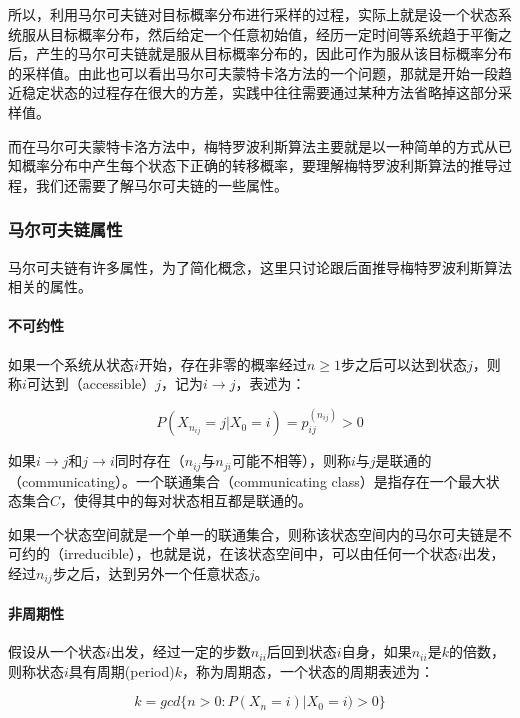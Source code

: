 所以，利用马尔可夫链对目标概率分布进行采样的过程，实际上就是设一个状态系统服从目标概率分布，然后给定一个任意初始值，经历一定时间等系统趋于平衡之后，产生的马尔可夫链就是服从目标概率分布的，因此可作为服从该目标概率分布的采样值。由此也可以看出马尔可夫蒙特卡洛方法的一个问题，那就是开始一段趋近稳定状态的过程存在很大的方差，实践中往往需要通过某种方法省略掉这部分采样值。

而在马尔可夫蒙特卡洛方法中，梅特罗波利斯算法主要就是以一种简单的方式从已知概率分布中产生每个状态下正确的转移概率，要理解梅特罗波利斯算法的推导过程，我们还需要了解马尔可夫链的一些属性。




\subsubsection{马尔可夫链属性}
马尔可夫链有许多属性，为了简化概念，这里只讨论跟后面推导梅特罗波利斯算法相关的属性。


\paragraph{不可约性}
如果一个系统从状态$i$开始，存在非零的概率经过$n\geq 1$步之后可以达到状态$j$，则称$i$可达到（accessible）$j$，记为$i\rightarrow j$，表述为：

\begin{equation}
	P(X_{n_{ij}}=j|X_0=i)=p^{(n_{ij})}_{ij}>0
\end{equation}

如果$i\rightarrow j$和$j\rightarrow i$同时存在（$n_{ij}$与$n_{ji}$可能不相等），则称$i$与$j$是联通的（communicating）。一个联通集合（communicating class）是指存在一个最大状态集合$C$，使得其中的每对状态相互都是联通的。

如果一个状态空间就是一个单一的联通集合，则称该状态空间内的马尔可夫链是不可约的（irreducible），也就是说，在该状态空间中，可以由任何一个状态$i$出发，经过$n_{ij}$步之后，达到另外一个任意状态$j$。




\paragraph{非周期性}
假设从一个状态$i$出发，经过一定的步数$n_{ii}$后回到状态$i$自身，如果$n_{ii}$是$k$的倍数，则称状态$i$具有周期(period)$k$，称为周期态，一个状态的周期表述为：

\begin{equation}
	k=gcd\{n>0:P(X_n=i)|X_0=i)>0\}
\end{equation}

